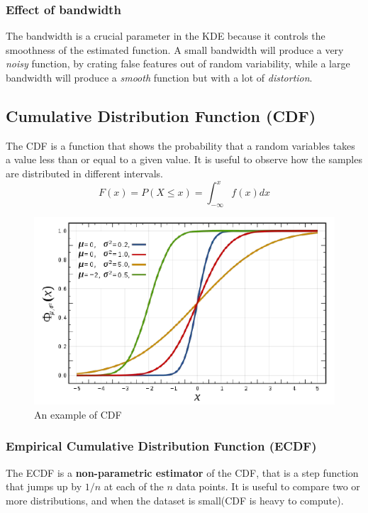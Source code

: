 \subsubsection{Effect of bandwidth}
The bandwidth is a crucial parameter in the KDE because it controls
the smoothness of the estimated function. A small bandwidth will
produce a very \textit{noisy} function, by crating false features out
of random variability, while a large bandwidth will produce a
\textit{smooth} function but with a lot of \textit{distortion}.

\subsection{Cumulative Distribution Function (CDF)}
The CDF is a function that shows the probability that a random
variables takes a value less than or equal to a given value. It is
useful to observe how the samples are distributed in different 
intervals.
$$ F(x) = P(X \leq x) = \int_{-\infty}^{x} f(x) dx$$
\begin{figure}[H]
  \centering
  \includegraphics[scale=0.60]{images/DataExplVis/CDF.png}
  \caption{An example of CDF}
  \label{fig:CDF}
\end{figure}

\subsubsection{Empirical Cumulative Distribution Function (ECDF)}
The ECDF is a \textbf{non-parametric estimator} of the CDF, that is a step 
function that jumps up by $1/n$ at each of the $n$ data points. It is 
useful to compare two or more distributions, and when the dataset is
small(CDF is heavy to compute).

